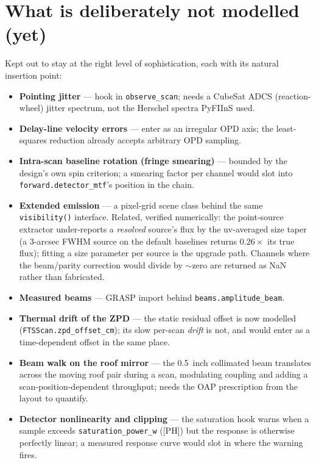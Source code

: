 \documentclass[11pt]{article}
\newcommand{\code}[1]{\texttt{\small #1}}
\begin{document}
\section{What is deliberately not modelled (yet)}

Kept out to stay at the right level of sophistication, each with its natural
insertion point:

\begin{itemize}
\item \textbf{Pointing jitter} --- hook in \code{observe\_scan}; needs a
CubeSat ADCS (reaction-wheel) jitter spectrum, not the Herschel spectra
PyFIInS used.
\item \textbf{Delay-line velocity errors} --- enter as an irregular OPD
axis; the least-squares reduction already accepts arbitrary OPD sampling.
\item \textbf{Intra-scan baseline rotation (fringe smearing)} --- bounded by
the design's own spin criterion; a smearing factor per channel would slot
into \code{forward.detector\_mtf}'s position in the chain.
\item \textbf{Extended emission} --- a pixel-grid scene class behind the
same \code{visibility()} interface. Related, verified numerically: the
point-source extractor under-reports a \emph{resolved} source's flux by
the uv-averaged size taper (a 3-arcsec FWHM source on the default
baselines returns $0.26\times$ its true flux); fitting a size parameter
per source is the upgrade path. Channels where the beam/parity
correction would divide by $\sim$zero are returned as NaN rather than
fabricated.
\item \textbf{Measured beams} --- GRASP import behind
\code{beams.amplitude\_beam}.
\item \textbf{Thermal drift of the ZPD} --- the static residual offset is
now modelled (\code{FTSScan.zpd\_offset\_cm}); its slow per-scan \emph{drift}
is not, and would enter as a time-dependent offset in the same place.
\item \textbf{Beam walk on the roof mirror} --- the \SI{0.5}{inch}
collimated beam translates across the moving roof pair during a scan,
modulating coupling and adding a scan-position-dependent throughput; needs
the OAP prescription from the layout to quantify.
\item \textbf{Detector nonlinearity and clipping} --- the saturation hook
warns when a sample exceeds \code{saturation\_power\_w} ([PH]) but the
response is otherwise perfectly linear; a measured response curve would
slot in where the warning fires.
\end{itemize}
\end{document}
